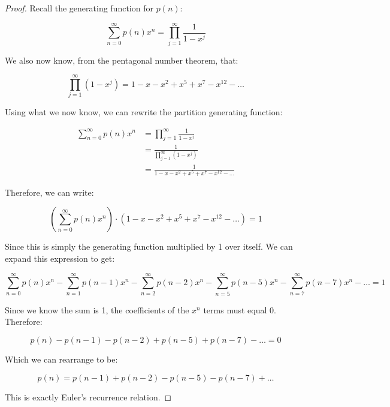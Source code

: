 \documentclass{article}
\theoremstyle{definition}
\begin{document}
\begin{proof}

\noindent
Recall the generating function for $p(n)$:

\[
\sum_{n=0}^{\infty} p(n)x^n = \prod_{j=1}^{\infty} \frac{1}{1-x^j}
\]

\noindent
We also now know, from the pentagonal number theorem, that:

\[
\prod_{j=1}^{\infty} (1 - x^j) = 1 - x - x^2 + x^5 + x^7 - x^{12} - \dots
\]

\noindent
Using what we now know, we can rewrite the partition generating function:

\[
\begin{aligned}
\sum_{n=0}^{\infty} p(n)x^n &= \prod_{j=1}^{\infty} \frac{1}{1-x^j} \\
&= \frac{1}{\prod_{j=1}^{\infty} (1 - x^j)} \\
&= \frac{1}{1 - x - x^2 + x^5 + x^7 - x^{12} - \dots}
\end{aligned}
\]

\noindent
Therefore, we can write:

\[
(\sum_{n=0}^{\infty} p(n)x^n) \cdot (1 - x - x^2 + x^5 + x^7 - x^{12} - \dots) = 1
\]

\noindent
Since this is simply the generating function multiplied by 1 over itself. We can expand this expression to get:

\[
\sum_{n=0}^{\infty} p(n)x^n - \sum_{n=1}^{\infty} p(n - 1)x^n - \sum_{n=2}^{\infty} p(n - 2)x^n -
\sum_{n=5}^{\infty} p(n - 5)x^n - \sum_{n=7}^{\infty} p(n - 7)x^n - \dots = 1
\]

\noindent
Since we know the sum is 1, the coefficients of the $x^n$ terms must equal 0. Therefore:

\[
p(n) - p(n-1) - p(n - 2) + p(n - 5) + p(n - 7) - \dots = 0
\]

\noindent
Which we can rearrange to be:

\[
p(n) = p(n-1) + p(n - 2) - p(n - 5) - p(n - 7) + \dots
\]

\noindent
This is exactly Euler's recurrence relation.

\end{proof}
\end{document}

